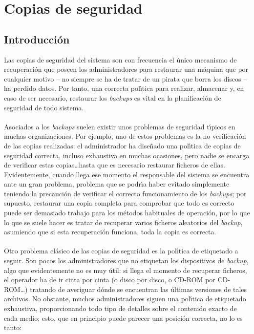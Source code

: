 \chapter{Copias de seguridad}
\section{Introducci\'on}
Las copias de seguridad del sistema son con frecuencia el \'unico mecanismo
de recuperaci\'on que poseen los administradores para restaurar una m\'aquina
que por cualquier motivo -- no siempre se ha de tratar de un pirata que borra
los discos -- ha perdido datos. Por tanto, una correcta pol\'{\i}tica para 
realizar, almacenar y, en caso de ser necesario, restaurar los {\it backups} es
vital en la planificaci\'on de seguridad de todo sistema.\\
\\Asociados a los {\it backups} suelen existir unos problemas de seguridad 
t\'{\i}picos en muchas organizaciones. Por ejemplo, uno de estos problemas es la
no verificaci\'on de las copias realizadas: el administrador ha dise\~nado una
pol\'{\i}tica de copias de seguridad correcta, incluso exhaustiva en muchas
ocasiones, pero nadie se encarga de verificar estas copias\ldots hasta que es
necesario restaurar ficheros de ellas. Evidentemente, cuando llega ese momento
el responsable del sistema se encuentra ante un gran problema, problema que se
podr\'{\i}a haber evitado simplemente teniendo la precauci\'on de verificar el
correcto funcionamiento de los {\it backups}; por supuesto, restaurar una 
copia completa para comprobar que todo es correcto puede ser demasiado trabajo
para los m\'etodos habituales de operaci\'on, por lo que lo que se suele hacer
es tratar de recuperar varios ficheros aleatorios del {\it backup}, asumiendo
que si esta recuperaci\'on funciona, toda la copia es correcta.\\
\\Otro problema cl\'asico de las copias de seguridad es la pol\'{\i}tica de 
etiquetado a seguir. Son pocos los administradores que no etiquetan los 
dispositivos de {\it backup}, algo que evidentemente no es muy \'util: si llega
el momento de recuperar ficheros, el operador ha de ir cinta por cinta (o
disco por disco, o CD-ROM por CD-ROM\ldots) tratando de averiguar d\'onde se
encuentran las \'ultimas versiones de tales archivos. No obstante, muchos 
administradores siguen una pol\'{\i}tica de etiquetado exhaustiva, 
proporcionando todo tipo de detalles sobre el contenido exacto de cada medio;
esto, que en principio puede parecer una posici\'on correcta, no lo es tanto:
